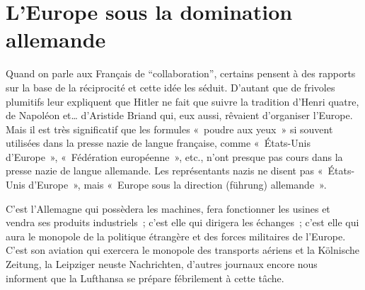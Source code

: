 \documentclass[french,twoside]{book} %
\begin{document}
\section[{L’Europe sous la domination allemande}]{L’Europe sous la domination allemande}
\noindent Quand on parle aux Français de “collaboration”, certains pensent à des rapports sur la base de la réciprocité et cette idée les séduit. D’autant que de frivoles plumitifs leur expliquent que Hitler ne fait que suivre la tradition d’Henri quatre, de Napoléon et… d’Aristide Briand qui, eux aussi, rêvaient d’organiser l’Europe. Mais il est très significatif que les formules « poudre aux yeux » si souvent utilisées dans la presse nazie de langue française, comme « États-Unis d’Europe », « Fédération européenne », etc., n’ont presque pas cours dans la presse nazie de langue allemande. Les représentants nazis ne disent pas « États-Unis d’Europe », mais « Europe sous la direction (führung) allemande ».\par
C’est l’Allemagne qui possèdera les machines, fera fonctionner les usines et vendra ses produits industriels ; c’est elle qui dirigera les échanges ; c’est elle qui aura le monopole de la politique étrangère et des forces militaires de l’Europe. C’est son aviation qui exercera le monopole des transports aériens et la Kölnische Zeitung, la Leipziger neuste Nachrichten, d’autres journaux encore nous informent que la Lufthansa se prépare fébrilement à cette tâche.
\end{document}
